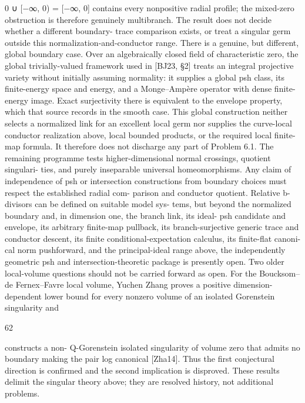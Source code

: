 \documentclass[11pt]{article}
\begin{document}
\begin{OriginalTaskDATA}
{0} ∪ [−∞, 0) = [−∞, 0] contains every nonpositive radial proﬁle; the mixed-zero obstruction
is therefore genuinely multibranch. The result does not decide whether a diﬀerent boundary-
trace comparison exists, or treat a singular germ outside this normalization-and-conductor
range.
    There is a genuine, but diﬀerent, global boundary case. Over an algebraically closed
ﬁeld of characteristic zero, the global trivially-valued framework used in [BJ23, §2] treats an
integral projective variety without initially assuming normality: it supplies a global psh class,
its ﬁnite-energy space and energy, and a Monge–Ampère operator with dense ﬁnite-energy
image. Exact surjectivity there is equivalent to the envelope property, which that source
records in the smooth case. This global construction neither selects a normalized link for an
excellent local germ nor supplies the curve-local conductor realization above, local bounded
products, or the required local ﬁnite-map formula. It therefore does not discharge any part
of Problem 6.1.
    The remaining programme tests higher-dimensional normal crossings, quotient singulari-
ties, and purely inseparable universal homeomorphisms. Any claim of independence of psh
or intersection constructions from boundary choices must respect the established radial com-
parison and conductor quotient. Relative b-divisors can be deﬁned on suitable model sys-
tems, but beyond the normalized boundary and, in dimension one, the branch link, its ideal-
psh candidate and envelope, its arbitrary ﬁnite-map pullback, its branch-surjective generic
trace and conductor descent, its ﬁnite conditional-expectation calculus, its ﬁnite-ﬂat canoni-
cal norm pushforward, and the principal-ideal range above, the independently geometric psh
and intersection-theoretic package is presently open.
    Two older local-volume questions should not be carried forward as open. For the
Boucksom–de Fernex–Favre local volume, Yuchen Zhang proves a positive dimension-
dependent lower bound for every nonzero volume of an isolated Gorenstein singularity and

                                               62

constructs a non- Q-Gorenstein isolated singularity of volume zero that admits no boundary
making the pair log canonical [Zha14]. Thus the ﬁrst conjectural direction is conﬁrmed and
the second implication is disproved. These results delimit the singular theory above; they are
resolved history, not additional problems.





\end{OriginalTaskDATA}
\end{document}
